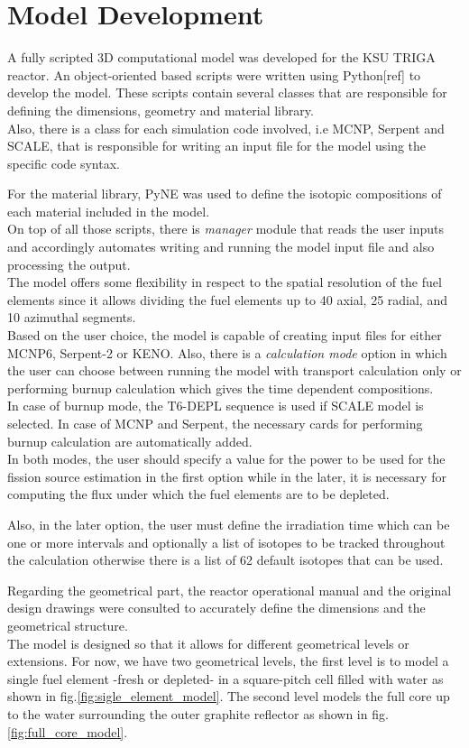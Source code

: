 \documentclass[review,number,sort&compress,12pt]{elsarticle}
\begin{document}
\section{Model Development}

A fully scripted 3D computational model was developed for the KSU TRIGA reactor. An object-oriented based scripts were written using Python[ref] to develop the model. These scripts contain several classes that are responsible for defining the dimensions, geometry and material library. \\
Also, there is a class for each simulation code involved, i.e MCNP, Serpent and SCALE, that is responsible for writing an input file for the model using the specific code syntax.

For the material library, PyNE \cite{bates2014pyne} was used to define the isotopic compositions of each material included in the model.\\
On top of all those scripts, there is \emph{manager} module that reads the user inputs and accordingly automates writing and running the model input file and also processing the output.\\
The model offers some flexibility in respect to the spatial resolution of the fuel elements since it allows dividing the fuel elements up to 40 axial, 25 radial, and 10 azimuthal segments.\\
Based on the user choice, the model is capable of creating input files for either MCNP6, Serpent-2 or KENO. Also, there is a \emph{calculation mode} option in which the user can choose between running the model with transport calculation only or performing burnup calculation which gives the time dependent compositions.\\
In case of burnup mode, the T6-DEPL sequence is used if SCALE model is selected. In case of MCNP and Serpent, the necessary cards for performing burnup calculation are automatically added. \\
In both modes, the user should specify a value for the power to be used for the fission source estimation in the first option while in the later, it is necessary for computing the flux under which the fuel elements are to be depleted.

Also, in the later option, the user must define the irradiation time which can be one or more intervals and optionally a list of isotopes to be tracked throughout the calculation otherwise there is a list of 62 default isotopes that can be used.

Regarding the geometrical part, the reactor operational manual and the original design drawings were consulted to accurately define the dimensions and the geometrical structure.\\  The model is designed so that it allows for different geometrical levels or extensions. For now, we have two geometrical levels, the first level is to model a single fuel element -fresh or depleted- in a square-pitch cell filled with water as shown in fig.\ref{fig:sigle_element_model}.
 The second level models the full core up to the water surrounding the outer graphite reflector as shown in fig.\ref{fig:full_core_model}.
\end{document}
